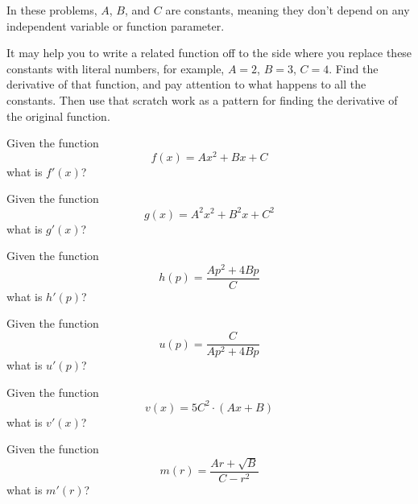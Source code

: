 
In these problems, $A$, $B$, and $C$ are constants, meaning they don't depend on any independent variable or function parameter.

It may help you to write a related function off to the side where you replace these constants with literal numbers, for example, $A=2$, $B=3$, $C=4$.
Find the derivative of that function, and pay attention to what happens to all the constants.
Then use that scratch work as a pattern for finding the derivative of the original function.

\begin{ProblemSet}[pencil space=2in]
 \begin{Problem}
  Given the function
  \begin{equation*}
   f(x) = A x^2 + B x + C
  \end{equation*}
  what is $f'(x)$?
 \end{Problem}
 \begin{Problem}
  Given the function
  \begin{equation*}
   g(x) = A^2 x^2 + B^2 x + C^2
  \end{equation*}
  what is $g'(x)$?
 \end{Problem}
 \begin{Problem}
  Given the function
  \begin{equation*}
   h(p) = \frac{A p^2 + 4 B p}{C}
  \end{equation*}
  what is $h'(p)$?
 \end{Problem}
 \begin{Problem}
  Given the function
  \begin{equation*}
   u(p) = \frac{C}{A p^2 + 4 B p}
  \end{equation*}
  what is $u'(p)$?
 \end{Problem}
 \begin{Problem}
  Given the function
  \begin{equation*}
   v(x) = 5 C^2\cdot(A x + B)
  \end{equation*}
  what is $v'(x)$?
 \end{Problem}
 \begin{Problem}
  Given the function
  \begin{equation*}
   m(r) = \frac{A r + \sqrt{B}}{C - r^2}
  \end{equation*}
  what is $m'(r)$?
 \end{Problem}
\end{ProblemSet}
